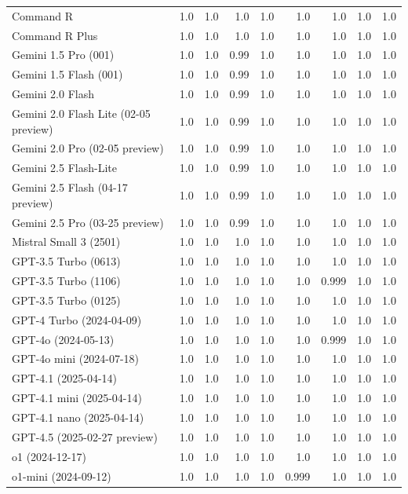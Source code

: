 \begin{table}[htp]
{\begin{tabular}{lrrrrrrrr}
Command R & 1.0 & 1.0 & 1.0 & 1.0 & 1.0 & 1.0 & 1.0 & 1.0 \\
Command R Plus & 1.0 & 1.0 & 1.0 & 1.0 & 1.0 & 1.0 & 1.0 & 1.0 \\
Gemini 1.5 Pro (001) & 1.0 & 1.0 & 0.99 & 1.0 & 1.0 & 1.0 & 1.0 & 1.0 \\
Gemini 1.5 Flash (001) & 1.0 & 1.0 & 0.99 & 1.0 & 1.0 & 1.0 & 1.0 & 1.0 \\
Gemini 2.0 Flash & 1.0 & 1.0 & 0.99 & 1.0 & 1.0 & 1.0 & 1.0 & 1.0 \\
Gemini 2.0 Flash Lite (02-05 preview) & 1.0 & 1.0 & 0.99 & 1.0 & 1.0 & 1.0 & 1.0 & 1.0 \\
Gemini 2.0 Pro (02-05 preview) & 1.0 & 1.0 & 0.99 & 1.0 & 1.0 & 1.0 & 1.0 & 1.0 \\
Gemini 2.5 Flash-Lite & 1.0 & 1.0 & 0.99 & 1.0 & 1.0 & 1.0 & 1.0 & 1.0 \\
Gemini 2.5 Flash (04-17 preview) & 1.0 & 1.0 & 0.99 & 1.0 & 1.0 & 1.0 & 1.0 & 1.0 \\
Gemini 2.5 Pro (03-25 preview) & 1.0 & 1.0 & 0.99 & 1.0 & 1.0 & 1.0 & 1.0 & 1.0 \\
Mistral Small 3 (2501) & 1.0 & 1.0 & 1.0 & 1.0 & 1.0 & 1.0 & 1.0 & 1.0 \\
GPT-3.5 Turbo (0613) & 1.0 & 1.0 & 1.0 & 1.0 & 1.0 & 1.0 & 1.0 & 1.0 \\
GPT-3.5 Turbo (1106) & 1.0 & 1.0 & 1.0 & 1.0 & 1.0 & 0.999 & 1.0 & 1.0 \\
GPT-3.5 Turbo (0125) & 1.0 & 1.0 & 1.0 & 1.0 & 1.0 & 1.0 & 1.0 & 1.0 \\
GPT-4 Turbo (2024-04-09) & 1.0 & 1.0 & 1.0 & 1.0 & 1.0 & 1.0 & 1.0 & 1.0 \\
GPT-4o (2024-05-13) & 1.0 & 1.0 & 1.0 & 1.0 & 1.0 & 0.999 & 1.0 & 1.0 \\
GPT-4o mini (2024-07-18) & 1.0 & 1.0 & 1.0 & 1.0 & 1.0 & 1.0 & 1.0 & 1.0 \\
GPT-4.1 (2025-04-14) & 1.0 & 1.0 & 1.0 & 1.0 & 1.0 & 1.0 & 1.0 & 1.0 \\
GPT-4.1 mini (2025-04-14) & 1.0 & 1.0 & 1.0 & 1.0 & 1.0 & 1.0 & 1.0 & 1.0 \\
GPT-4.1 nano (2025-04-14) & 1.0 & 1.0 & 1.0 & 1.0 & 1.0 & 1.0 & 1.0 & 1.0 \\
GPT-4.5 (2025-02-27 preview) & 1.0 & 1.0 & 1.0 & 1.0 & 1.0 & 1.0 & 1.0 & 1.0 \\
o1 (2024-12-17) & 1.0 & 1.0 & 1.0 & 1.0 & 1.0 & 1.0 & 1.0 & 1.0 \\
o1-mini (2024-09-12) & 1.0 & 1.0 & 1.0 & 1.0 & 0.999 & 1.0 & 1.0 & 1.0 \\

\end{tabular}}
\end{table}
